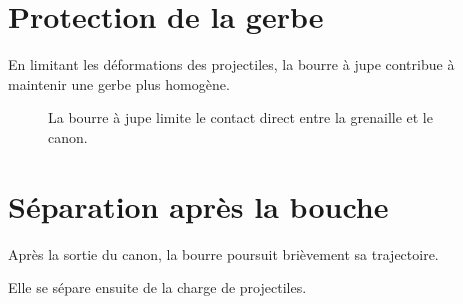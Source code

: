 \section{Protection de la gerbe}

En limitant les déformations des projectiles, la bourre à jupe contribue à
maintenir une gerbe plus homogène.

\begin{figure}[htbp]
\centering


\caption{La bourre à jupe limite le contact direct entre la grenaille et le canon.}
\label{fig:protection_grenaille}

\end{figure}

\section{Séparation après la bouche}

Après la sortie du canon, la bourre poursuit brièvement sa trajectoire.

Elle se sépare ensuite de la charge de projectiles.

